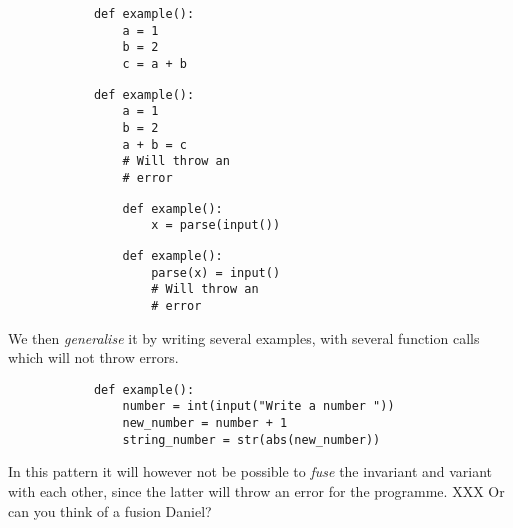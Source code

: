 \begin{enumerate}
            \hfill
     \begin{minipage}[t]{0.45\columnwidth}
        \begin{verbatim}
            def example():
                a = 1
                b = 2
                c = a + b  
        \end{verbatim}
    \end{minipage}
\hfill
    \begin{minipage}[t]{0.45\columnwidth}
        \begin{verbatim}
            def example():
                a = 1
                b = 2
                a + b = c 
                # Will throw an 
                # error  
        \end{verbatim}
    \end{minipage}
\hfill
\vspace{5pt}
\hfill 
        \begin{minipage}[t]{0.45\columnwidth}
            \begin{verbatim}
                def example():
                    x = parse(input())
            \end{verbatim}
        \end{minipage}
        \hfill
        \begin{minipage}[t]{0.45\columnwidth}
            \begin{verbatim}
                def example():
                    parse(x) = input() 
                    # Will throw an 
                    # error
            \end{verbatim}
        \end{minipage}
        \hfill
      
      We then \emph{generalise} it by writing several examples, with 
several function calls which will not throw errors. 

        \begin{verbatim}
            def example():
                number = int(input("Write a number "))
                new_number = number + 1
                string_number = str(abs(new_number))
        \end{verbatim}

\hfill
      
      In this pattern it will however not be possible to \emph{fuse} the 
invariant and variant with each other, since the latter will throw an 
error for the programme. XXX Or can you think of a fusion Daniel?
\end{enumerate}


